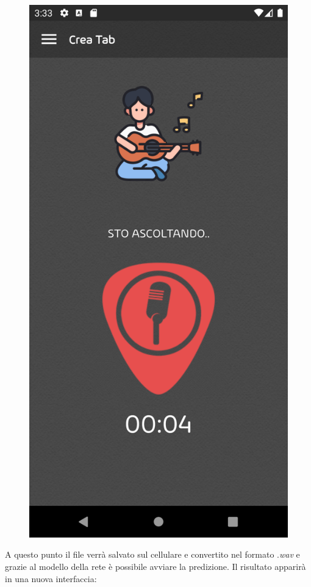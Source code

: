 \begin{figure}[H]
	\includegraphics[scale=0.10]{./images/img22.png}
\end{figure}
A questo punto il file verrà salvato sul cellulare e convertito nel formato .\textit{wav} e grazie al modello della rete è possibile avviare la predizione. Il risultato apparirà in una nuova interfaccia:

